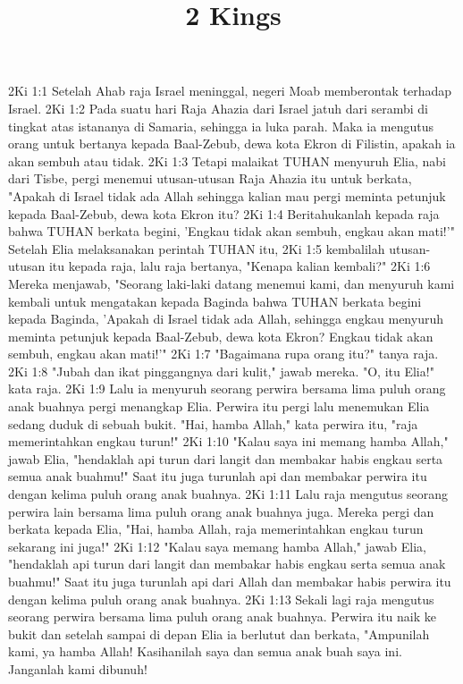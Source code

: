 

\title{2 Kings}

2Ki 1:1  Setelah Ahab raja Israel meninggal, negeri Moab memberontak terhadap Israel.
2Ki 1:2  Pada suatu hari Raja Ahazia dari Israel jatuh dari serambi di tingkat atas istananya di Samaria, sehingga ia luka parah. Maka ia mengutus orang untuk bertanya kepada Baal-Zebub, dewa kota Ekron di Filistin, apakah ia akan sembuh atau tidak.
2Ki 1:3  Tetapi malaikat TUHAN menyuruh Elia, nabi dari Tisbe, pergi menemui utusan-utusan Raja Ahazia itu untuk berkata, "Apakah di Israel tidak ada Allah sehingga kalian mau pergi meminta petunjuk kepada Baal-Zebub, dewa kota Ekron itu?
2Ki 1:4  Beritahukanlah kepada raja bahwa TUHAN berkata begini, 'Engkau tidak akan sembuh, engkau akan mati!'" Setelah Elia melaksanakan perintah TUHAN itu,
2Ki 1:5  kembalilah utusan-utusan itu kepada raja, lalu raja bertanya, "Kenapa kalian kembali?"
2Ki 1:6  Mereka menjawab, "Seorang laki-laki datang menemui kami, dan menyuruh kami kembali untuk mengatakan kepada Baginda bahwa TUHAN berkata begini kepada Baginda, 'Apakah di Israel tidak ada Allah, sehingga engkau menyuruh meminta petunjuk kepada Baal-Zebub, dewa kota Ekron? Engkau tidak akan sembuh, engkau akan mati!'"
2Ki 1:7  "Bagaimana rupa orang itu?" tanya raja.
2Ki 1:8  "Jubah dan ikat pinggangnya dari kulit," jawab mereka. "O, itu Elia!" kata raja.
2Ki 1:9  Lalu ia menyuruh seorang perwira bersama lima puluh orang anak buahnya pergi menangkap Elia. Perwira itu pergi lalu menemukan Elia sedang duduk di sebuah bukit. "Hai, hamba Allah," kata perwira itu, "raja memerintahkan engkau turun!"
2Ki 1:10  "Kalau saya ini memang hamba Allah," jawab Elia, "hendaklah api turun dari langit dan membakar habis engkau serta semua anak buahmu!" Saat itu juga turunlah api dan membakar perwira itu dengan kelima puluh orang anak buahnya.
2Ki 1:11  Lalu raja mengutus seorang perwira lain bersama lima puluh orang anak buahnya juga. Mereka pergi dan berkata kepada Elia, "Hai, hamba Allah, raja memerintahkan engkau turun sekarang ini juga!"
2Ki 1:12  "Kalau saya memang hamba Allah," jawab Elia, "hendaklah api turun dari langit dan membakar habis engkau serta semua anak buahmu!" Saat itu juga turunlah api dari Allah dan membakar habis perwira itu dengan kelima puluh orang anak buahnya.
2Ki 1:13  Sekali lagi raja mengutus seorang perwira bersama lima puluh orang anak buahnya. Perwira itu naik ke bukit dan setelah sampai di depan Elia ia berlutut dan berkata, "Ampunilah kami, ya hamba Allah! Kasihanilah saya dan semua anak buah saya ini. Janganlah kami dibunuh!
